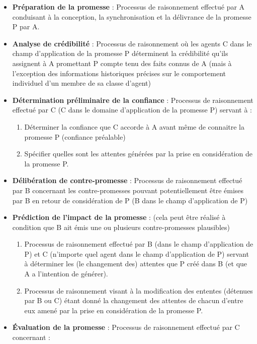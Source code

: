 \begin{itemize}
  \item \textbf{Préparation de la promesse} :
	Processus de raisonnement effectué par A conduisant à la conception, la
	synchronisation et la délivrance de la promesse P par A.
  \item \textbf{Analyse de crédibilité} :
	Processus de raisonnement où les agents C dans le champ d'application de
	la promesse P déterminent la crédibilité qu'ils assignent à A promettant
	P compte tenu des faits connus de A (mais à l'exception des informations
	historiques précises sur le comportement individuel d'un membre de sa
	classe d'agent)
  \item \textbf{Détermination préliminaire de la confiance} :
	Processus de raisonnement effectué par C (C dans le domaine
	d'application de la promesse P) servant à :
  	\begin{enumerate}
	  \item Déterminer la confiance que C accorde à A avant même de
		  connaitre la promesse P (confiance préalable)
	  \item Spécifier quelles sont les attentes générées par la prise en
		  considération de la promesse P.
  	\end{enumerate}
  \item \textbf{Délibération de contre-promesse} :
	Processus de raisonnement effectué par B concernant les contre-promesses
	pouvant potentiellement être émises par B en retour de considération de
	P (B dans le champ d'application de P)
  \item \textbf{Prédiction de l'impact de la promesse} :
	(cela peut être réalisé à condition que B ait émis une ou plusieurs
	contre-promesses plausibles)
  	\begin{enumerate}
	  \item Processus de raisonnement effectué par B (dans le champ
		  d'application de P) et C (n'importe quel agent dans le champ
		  d'application de P) servant à déterminer les (le changement
		  des) attentes que P créé dans B (et que A a l'intention de
		  générer).  
	  \item Processus de raisonnement visant à la modification des ententes
		  (détenues par B ou C) étant donné la changement des attentes
		  de chacun d'entre eux amené par la prise en considération de
		  la promesse P.
  	\end{enumerate}
  \item \textbf{Évaluation de la promesse} :
	Processus de raisonnement effectué par C concernant :

\end{itemize}
